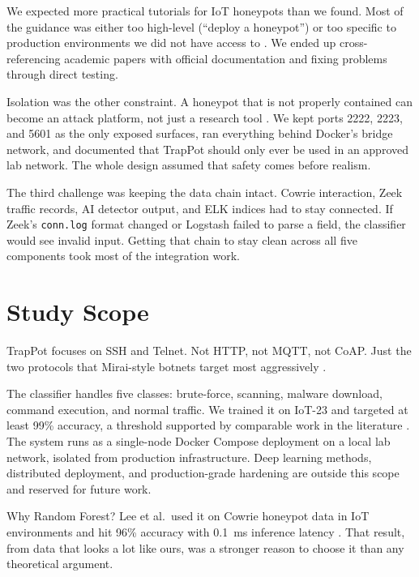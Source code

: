We expected more practical tutorials for IoT honeypots than we found. Most of the guidance was either too high-level (``deploy a honeypot'') or too specific to production environments we did not have access to \cite{franco2021survey,rodriguezgomez2025systematic}. We ended up cross-referencing academic papers with official documentation and fixing problems through direct testing.

Isolation was the other constraint. A honeypot that is not properly contained can become an attack platform, not just a research tool \cite{commey2025blockchain}. We kept ports 2222, 2223, and 5601 as the only exposed surfaces, ran everything behind Docker's bridge network, and documented that TrapPot should only ever be used in an approved lab network. The whole design assumed that safety comes before realism.

The third challenge was keeping the data chain intact. Cowrie interaction, Zeek traffic records, AI detector output, and ELK indices had to stay connected. If Zeek's \texttt{conn.log} format changed or Logstash failed to parse a field, the classifier would see invalid input. Getting that chain to stay clean across all five components took most of the integration work.

\section{Study Scope}
\label{sec:study_scope}

TrapPot focuses on SSH and Telnet. Not HTTP, not MQTT, not CoAP. Just the two protocols that Mirai-style botnets target most aggressively \cite{famera2025mirai,zhang2023identification}.

The classifier handles five classes: brute-force, scanning, malware download, command execution, and normal traffic. We trained it on IoT-23 \cite{iot23dataset} and targeted at least 99\% accuracy, a threshold supported by comparable work in the literature \cite{lee2021classification,karim2024efficient}. The system runs as a single-node Docker Compose deployment on a local lab network, isolated from production infrastructure. Deep learning methods, distributed deployment, and production-grade hardening are outside this scope and reserved for future work.

Why Random Forest? Lee et al.\ used it on Cowrie honeypot data in IoT environments and hit 96\% accuracy with 0.1~ms inference latency \cite{lee2021classification}. That result, from data that looks a lot like ours, was a stronger reason to choose it than any theoretical argument.

